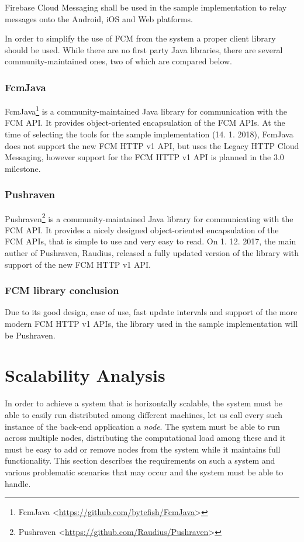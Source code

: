Firebase Cloud Messaging shall be used in the sample implementation to relay messages onto the Android, iOS and Web platforms. 

In order to simplify the use of FCM from the system a proper client library should be used. While there are no first party Java libraries, there are several community-maintained ones, two of which are compared below.

\subsubsection{FcmJava}
FcmJava\footnote{FcmJava <\url{https://github.com/bytefish/FcmJava}>} is a community-maintained Java library for communication with the FCM API. It provides object-oriented encapsulation of the FCM APIs. At the time of selecting the tools for the sample implementation (14. 1. 2018), FcmJava does not support the new FCM HTTP v1 API, but uses the Legacy HTTP Cloud Messaging, however support for the FCM HTTP v1 API is planned in the 3.0 milestone\cite{fcmJava}.

\subsubsection{Pushraven}
Pushraven\footnote{Pushraven <\url{https://github.com/Raudius/Pushraven}>} is a community-maintained Java library for communicating with the FCM API. It provides a nicely designed object-oriented encapsulation of the FCM APIs, that is simple to use and very easy to read. On 1. 12. 2017, the main auther of Pushraven, Raudius, released a fully updated version of the library with support of the new FCM HTTP v1 API\cite{pushraven-new-api}.

\subsubsection*{FCM library conclusion}
Due to its good design, ease of use, fast update intervals and support of the more modern FCM HTTP v1 APIs, the library used in the sample implementation will be Pushraven.

\section{Scalability Analysis}
In order to achieve a system that is horizontally scalable, the system must be able to easily run distributed among different machines, let us call every such instance of the back-end application a \textit{node}. The system must be able to run across multiple nodes, distributing the computational load among these and it must be easy to add or remove nodes from the system while it maintains full functionality. This section describes the requirements on such a system and various problematic scenarios that may occur and the system must be able to handle.

